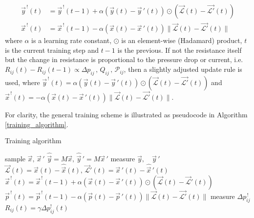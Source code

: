 \documentclass[%
 reprint,
 amsmath,amssymb,
 aps,
]{revtex4-2}
\begin{document}
{    \begin{align}
    \vec{y}^{\,!}\left(t\right) &= \vec{y}^{\,!}\left(t-1\right)
    +  \alpha\left(\vec{y}\left(t\right)-\vec{y}\,'\left(t\right)\right) 
    \odot \left(\vec{\mathcal{L}}\left(t\right)-\vec{\mathcal{L}'}\left(t\right)\right) \label{eq:dual_values_x} \\
    \vec{x}^{\,!}\left(t\right) &=  \vec{x}^{\,!}\left(t-1\right)
    - \alpha\left(\vec{x}\left(t\right)-\vec{x}\,'\left(t\right)\right) 
    \|\vec{\mathcal{L}}\left(t\right)-\vec{\mathcal{L}'}\left(t\right)\| \label{eq:dual_values_p}
    \end{align}
    where $\alpha$ is a learning rate constant, $ \odot$ is an element-wise (Hadamard) product, $t$ is the current training step and $t-1$ is the previous. 
    If not the resistance itself but the change in resistance is proportional to the pressure drop or current, i.e. 
    $R_{ij}\left(t\right) - R_{ij}\left(t-1\right) \propto \Delta p_{ij} \, , \,Q_{ij}\, , \, \mathcal{P}_{ij}$, 
    then a slightly adjusted update rule is used, where
    $\vec{y}^{\,!}\left(t\right) = \alpha\left(\vec{y}\left(t\right)-\vec{y}\,'\left(t\right)\right)\odot\left(\vec{\mathcal{L}}\left(t\right)-\vec{\mathcal{L}'}\left(t\right)\right)$ 
    and 
    $\vec{x}^{\,!}\left(t\right) = -\alpha\left(\vec{x}\left(t\right)-\vec{x}\,'\left(t\right)\right)\|\vec{\mathcal{L}}\left(t\right)-\vec{\mathcal{L}'}\left(t\right)\|$.
    
    For clarity, the general training scheme is illustrated as pseudocode in Algorithm \ref{training_algorithm}.

    \begin{algorithm}
    \caption{Training algorithm}\label{training_algorithm}
    \begin{algorithmic}
        \State sample $\vec{x},\,\vec{x}\,'$ \hfill {}
        \State $\hat{\vec{y}}=M\vec{x},\,\hat{\vec{y}}\,'=M\vec{x}\,'$ \hfill {}
        \State measure $\vec{y}, \quad \vec{y}\,'$ \hfill {}
        \State $\vec{\mathcal{L}}\left(t\right)=\vec{x}\left(t\right)-\hat{\vec{x}}\left(t\right),\,\vec{\mathcal{L}}'\left(t\right)=\vec{x}\,'\left(t\right)-\hat{\vec{x}}\,'\left(t\right)$ \hfill {}
        \State $\vec{x}^{\,!}\left(t\right)=\vec{x}^{\,!}\left(t-1\right)+\alpha\left(\vec{x}\left(t\right)-\vec{x}\,'\left(t\right)\right)\odot\left(\vec{\mathcal{L}}\left(t\right)-\vec{\mathcal{L}}'\left(t\right)\right)$
        \State $\vec{p}^{\,!}\left(t\right)=\vec{p}^{\,!}\left(t-1\right)-\alpha\left(\vec{p}\left(t\right)-\vec{p}\,'\left(t\right)\right)\|\vec{\mathcal{L}}\left(t\right)-\vec{\mathcal{L}'}\left(t\right)\|$
        \State \hfill {} 
        \State measure $\Delta p^{\,!}_{ij}$ \hfill {}
        \State $R_{ij}\left(t\right)=\gamma \Delta p^!_{ij}\left(t\right)$ \hfill {}
    \EndFor
    \end{algorithmic}
    \end{algorithm}

}
\end{document}
